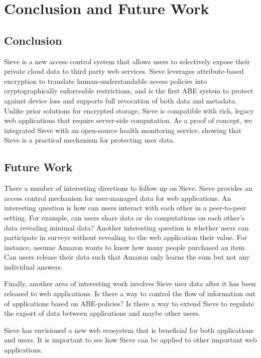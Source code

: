 \chapter{Conclusion and Future Work}

\section{Conclusion}

Sieve is a new access control system
that allows users to selectively expose
their private cloud data to third party
web services. Sieve leverages attribute-based
encryption to translate human-understandable
access policies into cryptographically
enforceable restrictions, and
is the first ABE system to protect against
device loss and supports full revocation
of both data and metadata. Unlike prior
solutions for encrypted storage, Sieve is
compatible with rich, legacy web applications
that require server-side computation.
As a proof of concept, we integrated Sieve
with an open-source health monitoring
service, showing that Sieve is a
practical mechanism for protecting
user data.

\section{Future Work}

There a number of interesting directions
to follow up on Sieve. Sieve provides
an access control mechanism for user-managed
data for web applications. An interesting
question is how can users interact with 
each other in a peer-to-peer setting. 
For example, can users share data or do 
computations on each other's data
revealing minimal data? Another interesting
question is whether users can participate
in surveys without revealing to the web
application their value. For instance,
assume Amazon wants to know how many
people purchased an item. Can users
release their data such that Amazon
only learns the sum but not any
individual answers.

Finally, another area of interesting work
involves Sieve user data after it has
been released to web applications.
Is there a way to control the flow
of information out of applications
based on ABE-policies? Is there a
way to extend Sieve to regulate
the export of data between applications
and maybe other users.

Sieve has envisioned a new web ecosystem
that is beneficial for both applications
and users. It is important to see how
Sieve can be applied to other important
web applications.